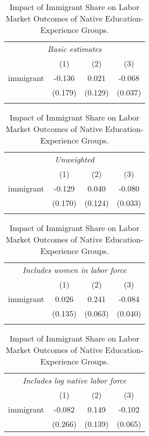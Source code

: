 \begin{table}[H]
\caption{\label{tab:table1}Impact of Immigrant Share on Labor Market Outcomes of Native Education-Experience Groups.}
\begin{center}
\def\sym#1{\ifmmode^{#1}\else\(^{#1}\)\fi} 

\begin{tabular}{lccc}
\multicolumn{4}{c}{\textit{Basic estimates}}\\
                    &\multicolumn{1}{c}{(1)}&\multicolumn{1}{c}{(2)}&\multicolumn{1}{c}{(3)}\\
\midrule
immigrant    &      -0.136&       0.021&      -0.068\\
                    &     (0.179)&     (0.129)&     (0.037)\\
\vspace{0.3mm}\\ \hline \end{tabular}         

\def\sym#1{\ifmmode^{#1}\else\(^{#1}\)\fi} 
\begin{tabular}{lccc}
\multicolumn{4}{c}{\textit{Unweighted}}\\
                    &\multicolumn{1}{c}{(1)}&\multicolumn{1}{c}{(2)}&\multicolumn{1}{c}{(3)}\\
\midrule
immigrant    &      -0.129&       0.040&      -0.080\\
                    &     (0.170)&     (0.124)&     (0.033)\\
\vspace{0.3mm}\\ \hline \end{tabular}    

\def\sym#1{\ifmmode^{#1}\else\(^{#1}\)\fi} 
\begin{tabular}{lccc}
\multicolumn{4}{c}{\textit{Includes women in labor force}}\\
                    &\multicolumn{1}{c}{(1)}&\multicolumn{1}{c}{(2)}&\multicolumn{1}{c}{(3)}\\
\midrule
immigrant    &       0.026&       0.241&      -0.084\\
                    &     (0.135)&     (0.063)&     (0.040)\\
\vspace{0.3mm}\\ \hline \end{tabular}     

\def\sym#1{\ifmmode^{#1}\else\(^{#1}\)\fi} 

\begin{tabular}{lccc}
\multicolumn{4}{c}{\textit{Includes log native labor force}}\\
                    &\multicolumn{1}{c}{(1)}&\multicolumn{1}{c}{(2)}&\multicolumn{1}{c}{(3)}\\
\midrule
immigrant    &      -0.082&       0.149&      -0.102\\
                    &     (0.266)&     (0.139)&     (0.065)\\


\end{tabular}
\end{center}
\end{table}
